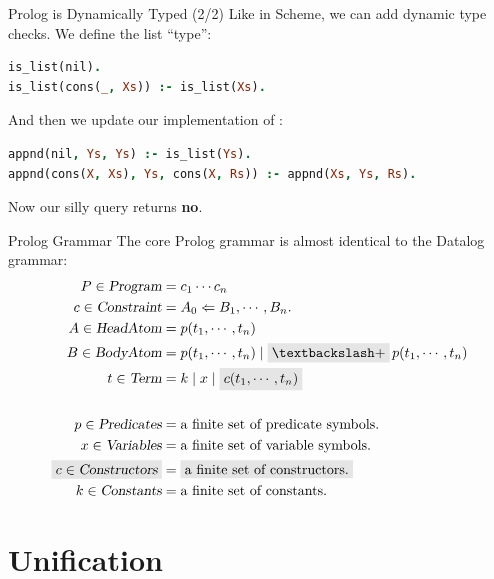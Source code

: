 \begin{frame}[fragile]{Prolog is Dynamically Typed (2/2)}
Like in Scheme, we can add dynamic type checks. We define the list ``type'':

\begin{lstlisting}[language=prolog, xleftmargin=0.5cm]
is_list(nil).
is_list(cons(_, Xs)) :- is_list(Xs).
\end{lstlisting}

\pause

And then we update our implementation of :

\begin{lstlisting}[language=prolog, xleftmargin=0.5cm]
appnd(nil, Ys, Ys) :- is_list(Ys).
appnd(cons(X, Xs), Ys, cons(X, Rs)) :- appnd(Xs, Ys, Rs).
\end{lstlisting}

Now our silly query  returns \textbf{no}.
\end{frame}

\begin{frame}{Prolog Grammar}
The core Prolog grammar is almost identical to the Datalog grammar:
{
\large
\begin{align*}
P \in \textsl{Program}      &= c_1 \cdots c_n \\
c \in \textsl{Constraint}   &= A_0 \Leftarrow B_1, \cdots, B_n. \\ 
A \in \textsl{HeadAtom}     &= p(t_1, \cdots, t_n) \\
B \in \textsl{BodyAtom}     &= p(t_1, \cdots, t_n) \mid \Highlight{\textbackslash+} \, p(t_1, \cdots, t_n) \\
t \in \textsl{Term}         &= k \mid x \mid \Highlight{c (t_1, \cdots, t_n)} \\
\\
p \in \textsl{Predicates}   & = \text{a finite set of predicate symbols.} \\
x \in \textsl{Variables}    & = \text{a finite set of variable symbols.} \\
\Highlight{c \in \textsl{Constructors}} & = \Highlight{\text{a finite set of constructors.}} \\
k \in \textsl{Constants}    & = \text{a finite set of constants.}
\end{align*}
}
\end{frame}

\section{Unification}

